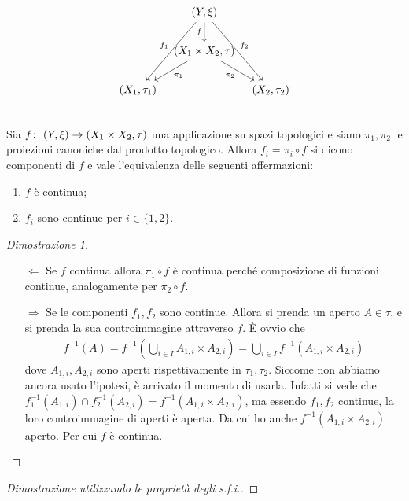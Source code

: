 \begin{theorem}
	\begin{equation}
		\begin{tikzcd}[column sep=0.7em]
		& (Y, \xi) \arrow[swap]{d}{f} \arrow[swap]{ddl}{f_1} \arrow{ddr}{f_2} & \\
		& (X_1 \times X_2, \tau) \arrow[swap]{dr}{\pi_2} \arrow{dl}{\pi_1} & \\
		(X_1, \tau_1) &  & (X_2, \tau_2)\\
		\end{tikzcd}
	\end{equation}
	Sia $f \colon\ (Y, \xi) \rightarrow (X_1 \times X_2, \tau)$ una applicazione su spazi topologici e siano $\pi_1,\pi_2$ le proiezioni canoniche dal prodotto topologico. Allora $f_i = \pi_i \circ f$ si dicono componenti di $f$ e vale l'equivalenza delle seguenti affermazioni:
	\begin{enumerate}
		\item $f$ è continua;
		\item $f_i$ sono continue per $i \in \{1,2\}$.
	\end{enumerate}
\end{theorem}
\begin{proof}[Dimostrazione 1]
	\begin{enumerate}
		\item[$\Leftarrow$] Se $f$ continua allora $\pi_1 \circ f$ è continua perché composizione di funzioni continue, analogamente per $\pi_2 \circ f$.
		\item[$\Rightarrow$] Se le componenti $f_1, f_2$ sono continue. Allora si prenda un aperto $A \in \tau$, e si prenda la sua controimmagine attraverso $f$. È ovvio che 
		\begin{equation}
		\begin{aligned}
			f^{-1}(A) = f^{-1}(\bigcup_{i \in I} A_{1,i} \times A_{2,i}) = \bigcup_{i \in I} f^{-1}(A_{1,i} \times A_{2,i})
		\end{aligned}
		\end{equation}
		dove $A_{1,i}, A_{2,i}$ sono aperti rispettivamente in $\tau_1, \tau_2$. Siccome non abbiamo ancora usato l'ipotesi, è arrivato il momento di usarla. Infatti si vede che $f^{-1}_1(A_{1,i}) \cap f^{-1}_2(A_{2,i}) = f^{-1}(A_{1,i} \times A_{2,i})$, ma essendo $f_1, f_2$ continue, la loro controimmagine di aperti è aperta. Da cui ho anche $f^{-1}(A_{1,i} \times A_{2,i})$ aperto. Per cui $f$ è continua. 
	\end{enumerate}
\end{proof}
\begin{proof}[Dimostrazione utilizzando le proprietà degli s.f.i.]
\end{proof}

